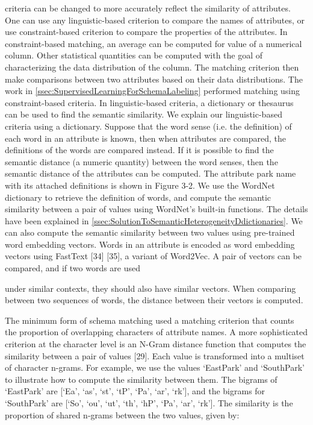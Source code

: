 criteria can be changed to more accurately reflect the similarity of attributes. One can use any linguistic-based criterion to compare the names of attributes, or use constraint-based criterion to compare the properties of the attributes. In constraint-based matching, an average can be computed for value of a numerical column. Other statistical quantities can be computed with the goal of characterizing the data distribution of the column. The matching criterion then make comparisons between two attributes based on their data distributions. The work in \autoref{ssec:SupervisedLearningForSchemaLabeling} performed matching using constraint-based criteria.
In linguistic-based criteria, a dictionary or thesaurus can be used to find the semantic similarity. We explain our linguistic-based criteria using a dictionary. Suppose that the word sense (i.e. the definition) of each word in an attribute is known, then when attributes are compared, the definitions of the words are compared instead. If it is possible to find the semantic distance (a numeric quantity) between the word senses, then the semantic distance of the attributes can be computed. The attribute park name with its attached definitions is shown in Figure 3-2.
We use the WordNet dictionary to retrieve the definition of words, and compute the semantic similarity between a pair of values using WordNet's built-in functions. The details have been explained in \autoref{ssec:SolutionToSemanticHeterogeneityDdictionaries}.
We can also compute the semantic similarity between two values using pre-trained word embedding vectors. Words in an attribute is encoded as word embedding vectors using FastText \cite{Mudgal2018Deep}[34] \cite{Nargesian2018Table}[35], a variant of Word2Vec. A pair of vectors can be compared, and if two words are used

under similar contexts, they should also have similar vectors. When comparing between two sequences of words, the distance between their vectors is computed.

The minimum form of schema matching used a matching criterion that counts the proportion of overlapping characters of attribute names. A more sophisticated criterion at the character level is an N-Gram distance function that computes the similarity between a pair of values \cite{loper-bird-2002-nltk}[29]. Each value is transformed into a multiset of character n-grams. For example, we use the values `EastPark' and `SouthPark' to illustrate how to compute the similarity between them. The bigrams of `EastPark' are [`Ea', `as', `st', `tP', `Pa', `ar', `rk'], and the bigrams for `SouthPark' are [`So', `ou', `ut', `th', `hP', `Pa', `ar', `rk']. The similarity is the proportion of shared n-grams between the two values, given by:

